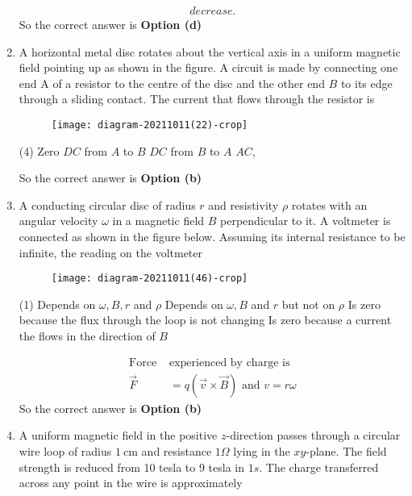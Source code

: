 \begin{enumerate}
\begin{answer}
\begin{align*}
{		decrease.}
	\end{align*}
	So the correct answer is \textbf{Option (d)}
\end{answer}
	\item A horizontal metal disc rotates about the vertical axis in a uniform magnetic field pointing up as shown in the figure. A circuit is made by connecting one end A of a resistor to the centre of the disc and the other end $B$ to its edge through a sliding contact. The current that flows through the resistor is
	{}
	\begin{figure}[H]
		\centering
		\texttt{[image: diagram-20211011(22)-crop]}
	\end{figure}
	\begin{tasks}(4)
		\task[\textbf{a.}] Zero
		\task[\textbf{b.}] $D C$ from $A$ to $B$
		\task[\textbf{c.}] $D C$ from $B$ to $A$
		\task[\textbf{d.}] $A C$,
	\end{tasks}
\begin{answer}
	So the correct answer is \textbf{Option (b)}
\end{answer}
	\item  A conducting circular disc of radius $r$ and resistivity $\rho$ rotates with an angular velocity $\omega$ in a magnetic field $B$ perpendicular to it. A voltmeter is connected as shown in the figure below. Assuming its internal resistance to be infinite, the reading on the voltmeter
	{}
	\begin{figure}[H]
		\centering
		\texttt{[image: diagram-20211011(46)-crop]}
	\end{figure}
	\begin{tasks}(1)
		\task[\textbf{a.}] Depends on $\omega, B, r$ and $\rho$
		\task[\textbf{b.}] Depends on $\omega, B$ and $r$ but not on $\rho$
		\task[\textbf{c.}]  Is zero because the flux through the loop is not changing
		\task[\textbf{d.}] Is zero because a current the flows in the direction of $B$
	\end{tasks}	
\begin{answer}
	\begin{align*}
	\text{Force }&\text{experienced by charge is}\\
	\vec{F}&=q(\vec{v} \times \vec{B})\text{ and }v=r \omega
	\end{align*}
	So the correct answer is \textbf{Option (b)}
\end{answer}
	\item A uniform magnetic field in the positive $z$-direction passes through a circular wire loop of radius $1 \mathrm{~cm}$ and resistance $1 \Omega$ lying in the $x y$-plane. The field strength is reduced from 10 tesla to 9 tesla in $1 s$. The charge transferred across any point in the wire is approximately

\end{enumerate}
